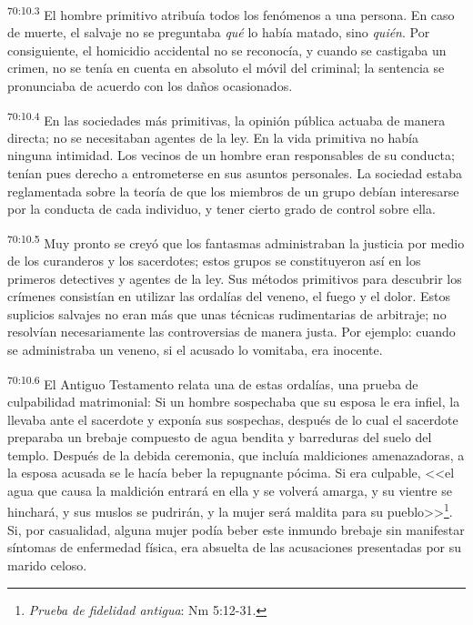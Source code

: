 \par
\textsuperscript{70:10.3} El hombre primitivo atribuía todos los fenómenos a una persona. En caso de muerte, el salvaje no se preguntaba \textit{qué} lo había matado, sino \textit{quién}. Por consiguiente, el homicidio accidental no se reconocía, y cuando se castigaba un crimen, no se tenía en cuenta en absoluto el móvil del criminal; la sentencia se pronunciaba de acuerdo con los daños ocasionados.

\par
\textsuperscript{70:10.4} En las sociedades más primitivas, la opinión pública actuaba de manera directa; no se necesitaban agentes de la ley. En la vida primitiva no había ninguna intimidad. Los vecinos de un hombre eran responsables de su conducta; tenían pues derecho a entrometerse en sus asuntos personales. La sociedad estaba reglamentada sobre la teoría de que los miembros de un grupo debían interesarse por la conducta de cada individuo, y tener cierto grado de control sobre ella.

\par
\textsuperscript{70:10.5} Muy pronto se creyó que los fantasmas administraban la justicia por medio de los curanderos y los sacerdotes; estos grupos se constituyeron así en los primeros detectives y agentes de la ley. Sus métodos primitivos para descubrir los crímenes consistían en utilizar las ordalías del veneno, el fuego y el dolor. Estos suplicios salvajes no eran más que unas técnicas rudimentarias de arbitraje; no resolvían necesariamente las controversias de manera justa. Por ejemplo: cuando se administraba un veneno, si el acusado lo vomitaba, era inocente.

\par
\textsuperscript{70:10.6} El Antiguo Testamento relata una de estas ordalías, una prueba de culpabilidad matrimonial: Si un hombre sospechaba que su esposa le era infiel, la llevaba ante el sacerdote y exponía sus sospechas, después de lo cual el sacerdote preparaba un brebaje compuesto de agua bendita y barreduras del suelo del templo. Después de la debida ceremonia, que incluía maldiciones amenazadoras, a la esposa acusada se le hacía beber la repugnante pócima. Si era culpable, <<el agua que causa la maldición entrará en ella y se volverá amarga, y su vientre se hinchará, y sus muslos se pudrirán, y la mujer será maldita para su pueblo>>\footnote{\textit{Prueba de fidelidad antigua}: Nm 5:12-31.}. Si, por casualidad, alguna mujer podía beber este inmundo brebaje sin manifestar síntomas de enfermedad física, era absuelta de las acusaciones presentadas por su marido celoso.

